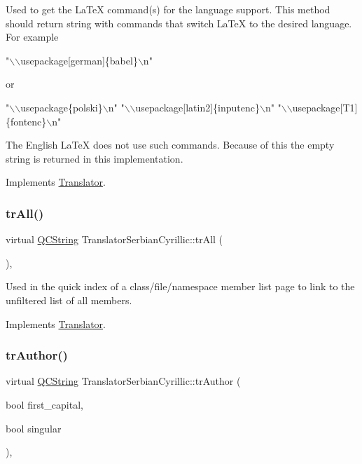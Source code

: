 Used to get the La\+TeX command(s) for the language support. This method should return string with commands that switch La\+TeX to the desired language. For example 
\begin{DoxyPre}"\(\backslash\)\(\backslash\)usepackage[german]\{babel\}\(\backslash\)n"
 \end{DoxyPre}
 or 
\begin{DoxyPre}"\(\backslash\)\(\backslash\)usepackage\{polski\}\(\backslash\)n"
 "\(\backslash\)\(\backslash\)usepackage[latin2]\{inputenc\}\(\backslash\)n"
 "\(\backslash\)\(\backslash\)usepackage[T1]\{fontenc\}\(\backslash\)n"
 \end{DoxyPre}


The English La\+TeX does not use such commands. Because of this the empty string is returned in this implementation. 

Implements \mbox{\hyperlink{class_translator}{Translator}}.

\mbox{\label{class_translator_serbian_cyrillic_ae0f9eceba130f83acd4845cd783e2558}} 
\subsubsection{\texorpdfstring{trAll()}{trAll()}}
{\footnotesize\ttfamily virtual \mbox{\hyperlink{class_q_c_string}{Q\+C\+String}} Translator\+Serbian\+Cyrillic\+::tr\+All (\begin{DoxyParamCaption}{ }\end{DoxyParamCaption})\hspace{0.3cm}{\ttfamily [inline]}, {\ttfamily [virtual]}}

Used in the quick index of a class/file/namespace member list page to link to the unfiltered list of all members. 

Implements \mbox{\hyperlink{class_translator}{Translator}}.

\mbox{\label{class_translator_serbian_cyrillic_a702ebd41ff43cba4154a980781c43eea}} 
\subsubsection{\texorpdfstring{trAuthor()}{trAuthor()}}
{\footnotesize\ttfamily virtual \mbox{\hyperlink{class_q_c_string}{Q\+C\+String}} Translator\+Serbian\+Cyrillic\+::tr\+Author (\begin{DoxyParamCaption}\item[{bool}]{first\+\_\+capital,  }\item[{bool}]{singular }\end{DoxyParamCaption})\hspace{0.3cm}{\ttfamily [inline]}, {\ttfamily [virtual]}}

